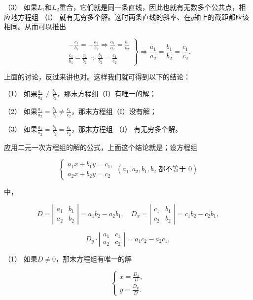 （3）
如果\(L_{1}\)和\(L_{2}\)重合，它们就是同一条直线，因此也就有无数多个公共点，相应地方程组
（I）
就有无穷多个解。这时两条直线的斜率、在\(y\)轴上的截距都应该相同。从而可以推出

\[
\left. \begin{array}{l} - \frac{c_{1}}{b_{1}} = - \frac{a_{2}}{b_{2}} \Rightarrow \frac{a_{1}}{a_{2}} = \frac{b_{1}}{b_{2}} \\ \frac{c_{1}}{b_{1}} - \frac{c_{2}}{b_{2}} \Rightarrow \frac{b_{1}}{b_{2}} = \frac{c_{1}}{c_{2}} \end{array} \right\} \Rightarrow \frac{a_{1}}{a_{2}} = \frac{b_{1}}{b_{2}} = \frac{c_{1}}{c_{2}}.
\]

上面的讨论，反过来讲也对。这样我们就可得到以下的结论：

（1）
如果\(\frac{a_{1}}{a_{2}} \neq \frac{b_{1}}{b_{2}}\)，那末方程组（I）有唯一的解；

（2）
如果\(\frac{a_{1}}{a_{2}} = \frac{b_{1}}{b_{2}} \neq \frac{c_{1}}{c_{2}}\)，那末方程组（I）没有解；

（3）
如果\(\frac{a_{1}}{a_{2}} = \frac{b_{1}}{b_{2}} = \frac{c_{1}}{c_{2}}\)，那末方程组
（I） 有无穷多个解。

应用二元一次方程组的解的公式，上面这个结论就是；设方程组

\[
\left\{ \begin{array}{l} a_{1} x + b_{1} y = c_{1}, \\ a_{2} x + b_{2} y = c_{2} \end{array} \right. (a_{1}, a_{2}, b_{1}, b_{2} \text{ 都不等于 } 0)
\]

中，

\[
D = \left| \begin{array}{ll} a_{1} & b_{1} \\ a_{2} & b_{2} \end{array} \right| = a_{1} b_{2} - a_{2} b_{1}, \quad D_{x} = \left| \begin{array}{ll} c_{1} & b_{1} \\ c_{2} & b_{2} \end{array} \right| = c_{1} b_{2} - c_{2} b_{1},
\]

\[
D_{y} \cdot \left| \begin{array}{ll} a_{1} & c_{1} \\ a_{2} & c_{2} \end{array} \right| = a_{1} c_{2} - a_{2} c_{1},
\]

（1） 如果\(D \neq 0\)，那末方程组有唯一的解

\[
\left\{ \begin{array}{l} x = \frac{D_{x}}{D}, \\ y = \frac{D_{y}}{D}. \end{array} \right.
\]

